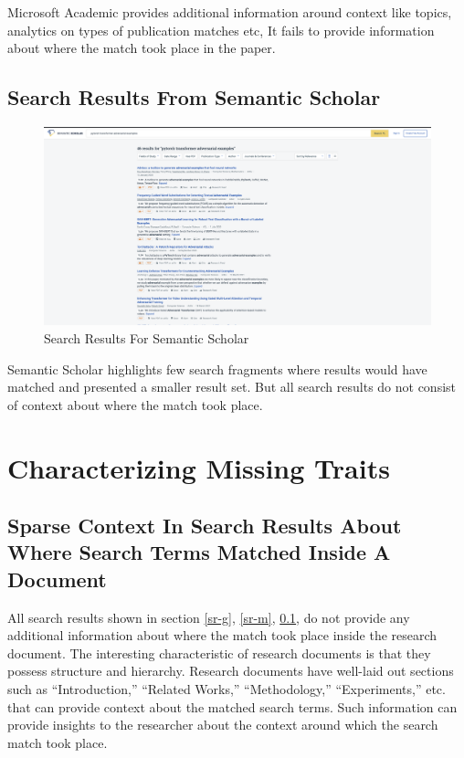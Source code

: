 Microsoft Academic provides additional information around context like topics, analytics on types of publication matches etc,
It fails to provide information about where the match took place in the paper.

\pagebreak
\subsection{Search Results From Semantic Scholar}
\label{sr-s}
\begin{figure}[h]
    \centering
    \includegraphics[width=\maxwidth{\textwidth}]{src/images/ss-example.png}
    \caption{Search Results For Semantic Scholar}
    \label{figure\arabic{figurecounter}}
\end{figure}
Semantic Scholar highlights few search fragments where results would have matched and presented a smaller result set. 
But all search results do not consist of context about where the match took place. 

\pagebreak
\section{Characterizing Missing Traits}
\label{section:intro:missing_traits}

\subsection{Sparse Context In Search Results About Where Search Terms Matched Inside A Document}

All search results shown in section \ref{sr-g}, \ref{sr-m}, \ref{sr-s}, do not provide any additional information about where the match took place inside the research document. The interesting characteristic of research documents is that they possess structure and hierarchy. Research documents have well-laid out sections such as “Introduction,” “Related Works,” “Methodology,” “Experiments,” etc. that can provide context about the matched search terms. Such information can provide insights to the researcher about the context around which the search match took place. 


